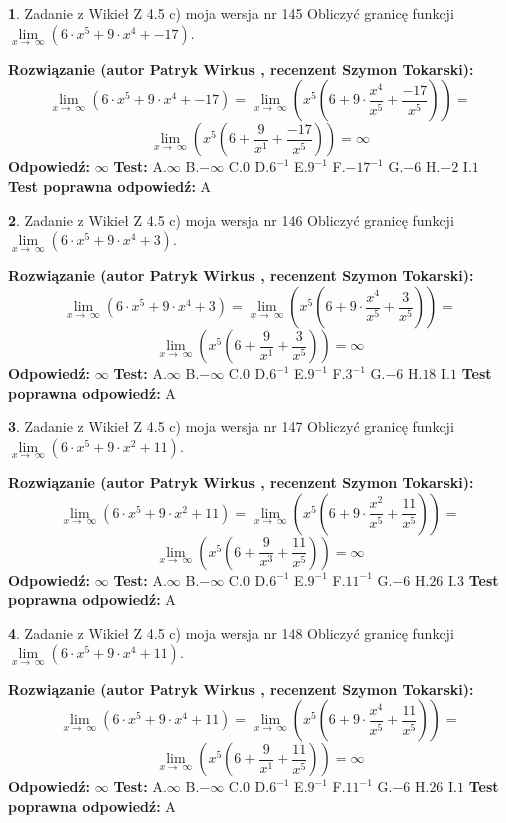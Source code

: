 \documentclass[12pt, a4paper]{article}
\theoremstyle{definition} %
\newtheorem{zad}{}
\newcommand{\zadStart}[1]{\begin{zad}#1\newline}
\newcommand{\zadStop}{\end{zad}}
\newcommand{\rozwStart}[2]{\noindent \textbf{Rozwiązanie (autor #1 , recenzent #2): }\newline}
\newcommand{\rozwStop}{\newline}
\newcommand{\odpStart}{\noindent \textbf{Odpowiedź:}\newline}
\newcommand{\odpStop}{\newline}
\newcommand{\testStart}{\noindent \textbf{Test:}\newline}
\newcommand{\testStop}{\newline}
\newcommand{\kluczStart}{\noindent \textbf{Test poprawna odpowiedź:}\newline}
\newcommand{\kluczStop}{\newline}
\begin{document}
\zadStart{Zadanie z Wikieł Z 4.5 c) moja wersja nr 145}
Obliczyć granicę funkcji  $\lim\limits_{x\to\ \infty}(6 \cdot x^{5}+9 \cdot x^{4}+-17)$.
\zadStop
\rozwStart{Patryk Wirkus}{Szymon Tokarski}
$$\lim\limits_{x\to\ \infty}(6 \cdot x^{5}+9 \cdot x^{4}+-17) = \lim\limits_{x\to\ \infty}(x^{5}(6 +9 \cdot \frac{x^{4}}{x^{5}}+\frac{-17}{x^{5}})) =$$ $$\lim\limits_{x\to\ \infty}(x^{5}(6 +\frac{9}{x^{1}}+\frac{-17}{x^{5}})) =\infty$$
\rozwStop
\odpStart
$\infty$
\odpStop
\testStart
A.$\infty$ B.$-\infty$ C.$0$ D.$6^{-1}$ E.$9^{-1}$
F.$-17^{-1}$ G.$-6$
H.$-2$
I.$1$
\testStop
\kluczStart
A
\kluczStop



\zadStart{Zadanie z Wikieł Z 4.5 c) moja wersja nr 146}
Obliczyć granicę funkcji  $\lim\limits_{x\to\ \infty}(6 \cdot x^{5}+9 \cdot x^{4}+3)$.
\zadStop
\rozwStart{Patryk Wirkus}{Szymon Tokarski}
$$\lim\limits_{x\to\ \infty}(6 \cdot x^{5}+9 \cdot x^{4}+3) = \lim\limits_{x\to\ \infty}(x^{5}(6 +9 \cdot \frac{x^{4}}{x^{5}}+\frac{3}{x^{5}})) =$$ $$\lim\limits_{x\to\ \infty}(x^{5}(6 +\frac{9}{x^{1}}+\frac{3}{x^{5}})) =\infty$$
\rozwStop
\odpStart
$\infty$
\odpStop
\testStart
A.$\infty$ B.$-\infty$ C.$0$ D.$6^{-1}$ E.$9^{-1}$
F.$3^{-1}$ G.$-6$
H.$18$
I.$1$
\testStop
\kluczStart
A
\kluczStop



\zadStart{Zadanie z Wikieł Z 4.5 c) moja wersja nr 147}
Obliczyć granicę funkcji  $\lim\limits_{x\to\ \infty}(6 \cdot x^{5}+9 \cdot x^{2}+11)$.
\zadStop
\rozwStart{Patryk Wirkus}{Szymon Tokarski}
$$\lim\limits_{x\to\ \infty}(6 \cdot x^{5}+9 \cdot x^{2}+11) = \lim\limits_{x\to\ \infty}(x^{5}(6 +9 \cdot \frac{x^{2}}{x^{5}}+\frac{11}{x^{5}})) =$$ $$\lim\limits_{x\to\ \infty}(x^{5}(6 +\frac{9}{x^{3}}+\frac{11}{x^{5}})) =\infty$$
\rozwStop
\odpStart
$\infty$
\odpStop
\testStart
A.$\infty$ B.$-\infty$ C.$0$ D.$6^{-1}$ E.$9^{-1}$
F.$11^{-1}$ G.$-6$
H.$26$
I.$3$
\testStop
\kluczStart
A
\kluczStop



\zadStart{Zadanie z Wikieł Z 4.5 c) moja wersja nr 148}
Obliczyć granicę funkcji  $\lim\limits_{x\to\ \infty}(6 \cdot x^{5}+9 \cdot x^{4}+11)$.
\zadStop
\rozwStart{Patryk Wirkus}{Szymon Tokarski}
$$\lim\limits_{x\to\ \infty}(6 \cdot x^{5}+9 \cdot x^{4}+11) = \lim\limits_{x\to\ \infty}(x^{5}(6 +9 \cdot \frac{x^{4}}{x^{5}}+\frac{11}{x^{5}})) =$$ $$\lim\limits_{x\to\ \infty}(x^{5}(6 +\frac{9}{x^{1}}+\frac{11}{x^{5}})) =\infty$$
\rozwStop
\odpStart
$\infty$
\odpStop
\testStart
A.$\infty$ B.$-\infty$ C.$0$ D.$6^{-1}$ E.$9^{-1}$
F.$11^{-1}$ G.$-6$
H.$26$
I.$1$
\testStop
\kluczStart
A
\kluczStop
\end{document}
